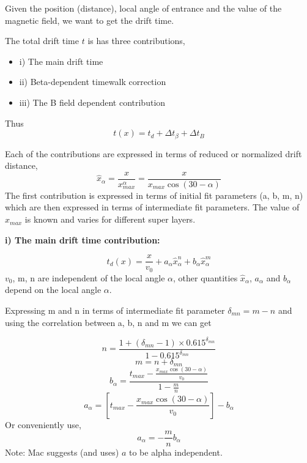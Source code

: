 \documentclass[12pt]{article}
\begin{document}
Given the position (distance), local angle of entrance and the value of the magnetic field, we want to get the drift time.
 
The total drift time $t$ is has three contributions,
\begin{itemize}
\item i) The main drift time 
\item ii) Beta-dependent timewalk correction
\item iii) The B field dependent contribution
\end{itemize}
Thus
\begin{equation}\label{}
t(x) = t_d + \Delta t_\beta + \Delta t_B
\end{equation}

Each of the contributions are expressed in terms of reduced or normalized drift distance,
\begin{equation}
\hat x_\alpha = \frac{x}{x_{max}^\alpha}=\frac{x}{x_{max}\cos(30 - \alpha)}
\end{equation}
The first contribution is expressed in terms of initial fit parameters (a, b, m, n) which are then expressed in terms of intermediate fit parameters. The value of $x_{max}$ is known and varies for different super layers.
 
\textbf{i) The main drift time contribution:}

\begin{equation}\label{}
t_d(x) = \frac{x}{v_0} + a_\alpha\hat x_\alpha^n + b_\alpha \hat x_\alpha^m 
\end{equation}
$v_0$, m, n  are independent of the local angle $\alpha$, other quantities $\hat x_\alpha$, $a_\alpha$ and $b_\alpha$ depend on the local angle $\alpha$.

Expressing m and n in terms of intermediate fit parameter $\delta_{mn} = m -n$ and using the correlation between a, b, n and m we can get

\begin{equation}\label{}
\boxed{n = \frac{1 + (\delta_{mn} - 1) \times 0.615^{\delta_{mn}}}{1 - 0.615^{\delta_{mn}}}}
\end{equation}
\begin{equation}\label{}
\boxed{m = n + \delta_{mn}}
\end{equation}
\begin{equation}\label{}
\boxed{b_\alpha = \frac{t_{max} - \frac{x_{max}\cos(30 - \alpha)}{v_0}}{1 - \frac{m}{n}}}
\end{equation}
\begin{equation}\label{}
a_\alpha  = [t_{max} - \frac{x_{max}\cos(30 - \alpha)}{v_0}] - b_\alpha
\end{equation}
Or conveniently use,
\begin{equation}\label{}
\boxed{a_\alpha = -\frac{m}{n} b_\alpha}
\end{equation}
Note: Mac suggests (and uses) $a$ to be alpha independent. 
\end{document}
